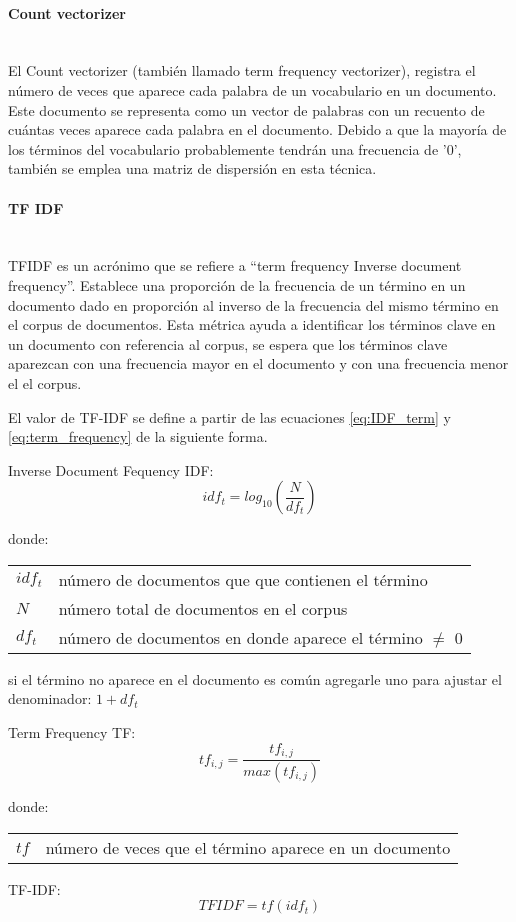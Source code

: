 \documentclass[12pt]{article}
\makeatletter
\newcommand{\subsubsubsection}[1]{\paragraph{#1}\mbox{}\\}
\newenvironment{conditions}
{\par\vspace{\abovedisplayskip}\noindent\begin{tabular}{>{$}l<{$} @{${}={}$} l}}
	{\end{tabular}\par\vspace{\belowdisplayskip}}
\makeatother
\begin{document}
				\subsubsubsection{Count vectorizer}
				El Count vectorizer (también llamado term frequency vectorizer), registra el número de veces que aparece cada palabra de un vocabulario en un documento. Este documento se representa como un vector de palabras con un recuento de cuántas veces aparece cada palabra en el documento. Debido a que la mayoría de los términos del vocabulario probablemente tendrán una frecuencia de '0', también se emplea una matriz de dispersión en esta técnica. \cite{Basarkar2017}
				
				\subsubsubsection{TF IDF}
				TFIDF es un acrónimo que se refiere a ``term frequency Inverse document frequency''. 
				Establece una proporción de la frecuencia de un término en un documento dado en proporción al inverso de la frecuencia del mismo término en el corpus de documentos.
				Esta métrica ayuda a identificar los términos clave en un documento con referencia al corpus, se espera que los términos clave aparezcan con una frecuencia mayor en el documento y con una frecuencia menor el el corpus. \cite{Siregar2019}
				
				El valor de TF-IDF se define a partir de las ecuaciones \ref{eq:IDF_term} y \ref{eq:term_frequency} de la siguiente forma.
								
				Inverse Document Fequency IDF:
				\begin{equation}\label{eq:IDF_term}
					idf_t = log_{10}(\frac{N}{df_t}) 
				\end{equation}
				
				donde:
				\begin{conditions}
					idf_t &  número de documentos que que contienen el término \\
					N     &  número total de documentos en el corpus \\   
					df_t  &  número de documentos en donde aparece el término $\neq$ 0
				\end{conditions}
				 si el término no aparece en el documento es común agregarle uno para ajustar el denominador: $1 + df_t $
				
				Term Frequency TF:
				\begin{equation}\label{eq:term_frequency}
				tf_{i,j}=\frac{tf_{i,j}}{max(tf_{i,j})}
				\end{equation}
				
				donde:
				\begin{conditions}
					tf &  número de veces que el término aparece en un documento 
				\end{conditions}			
			TF-IDF:
				\begin{equation}\label{eq:TFIDF}
				TFIDF=tf (idf_t)
				\end{equation}
				
\end{document}

